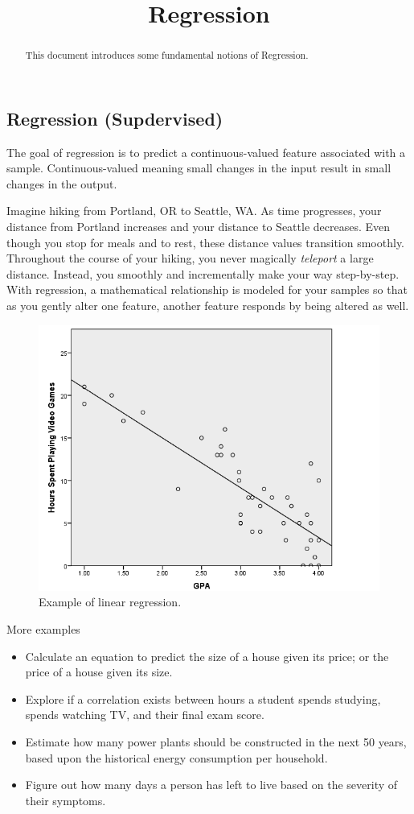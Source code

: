 \documentclass{article}
\begin{document}
\title{Regression}

\maketitle

\begin{abstract}
This document introduces some fundamental notions of Regression.
\end{abstract}

\subsection{Regression (Supdervised)}
\par The goal of regression is to predict a continuous-valued feature associated with a sample. Continuous-valued meaning small changes in the input result in small changes in the output.

Imagine hiking from Portland, OR to Seattle, WA. As time progresses, your distance from Portland increases and your distance to Seattle decreases. Even though you stop for meals and to rest, these distance values transition smoothly. Throughout the course of your hiking, you never magically {\it{teleport}} a large distance. Instead, you smoothly and incrementally make your way step-by-step. With regression, a mathematical relationship is modeled for your samples so that as you gently alter one feature, another feature responds by being altered as well.

\begin{figure}[H]
\centering
\includegraphics[width=0.6\linewidth]{pic/regression.png}
\caption{Example of linear regression.}
\end{figure}

More examples

\begin{itemize}
    \item Calculate an equation to predict the size of a house given its price; or the price of a house given its size.
    \item Explore if a correlation exists between hours a student spends studying, spends watching TV, and their final exam score.
    \item Estimate how many power plants should be constructed in the next 50 years, based upon the historical energy consumption per household.
    \item Figure out how many days a person has left to live based on the severity of their symptoms.
\end{itemize}
\end{document}
